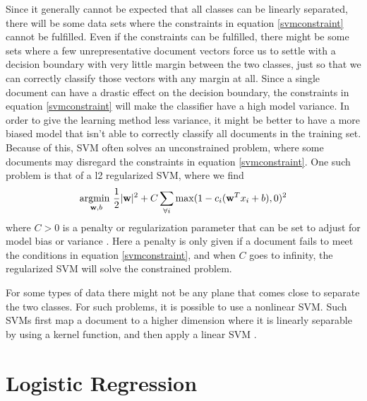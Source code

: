 Since it generally cannot be expected that all classes can be linearly separated, there will be some data sets where the constraints in equation \ref{svmconstraint} cannot be fulfilled. Even if the constraints can be fulfilled, there might be some sets where a few unrepresentative document vectors force us to settle with a decision boundary with very little margin between the two classes, just so that we can correctly classify those vectors with any margin at all. Since a single document can have a drastic effect on the decision boundary, the constraints in equation \ref{svmconstraint} will make the classifier have a high model variance. In order to give the learning method less variance, it might be better to have a more biased model that isn't able to correctly classify all documents in the training set. Because of this, SVM often solves an unconstrained problem, where some documents may disregard the constraints in equation \ref{svmconstraint}. One such problem is that of a l2 regularized SVM, where we find
\begin{equation}
\label{svmregularized}
\underset{\mathbf{w}, b}{\operatorname{argmin\text{ }}} \frac{1}{2}|\mathbf{w}|^2+C\sum_{\forall i} \max(1-c_i(\mathbf{w}^Tx_i+b), 0)^2
\end{equation}
where $C > 0$ is a penalty or regularization parameter that can be set to adjust for model bias or variance \cite{liblinear}. Here a penalty is only given if a document fails to meet the conditions in equation \ref{svmconstraint}, and when $C$ goes to infinity, the regularized SVM will solve the constrained problem.

For some types of data there might not be any plane that comes close to separate the two classes. For such problems, it is possible to use a nonlinear SVM. Such SVMs first map a document to a higher dimension where it is linearly separable by using a kernel function, and then apply a linear SVM \cite[p. 331]{information}. 

\section{Logistic Regression}
\label{sect:logisticregression}

